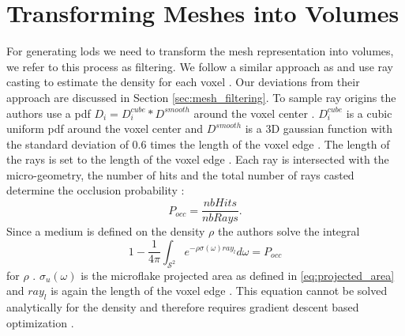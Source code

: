 \section{Transforming Meshes into Volumes}
\label{sec:transforming_meshes_into_volumes}
For generating \acp{lod} we need to transform the mesh representation into volumes, we refer to this process as filtering.
We follow a similar approach as \citeauthor{hybrid_mesh_volume_lods} and use ray casting to estimate the density for each voxel \cite{hybrid_mesh_volume_lods}.
Our deviations from their approach are discussed in Section \ref{sec:mesh_filtering}.
To sample ray origins the authors use a \ac{pdf} $D_i=D_i^{cube} \ast D^{smooth}$ around the voxel center \cite{hybrid_mesh_volume_lods}.
$D_i^{cube}$ is a cubic uniform \ac{pdf} around the voxel center and $D^{smooth}$ is a 3D gaussian function with the standard deviation of 0.6 times the length of the voxel edge \cite{hybrid_mesh_volume_lods}.
The length of the rays is set to the length of the voxel edge \cite{hybrid_mesh_volume_lods}.
Each ray is intersected with the micro-geometry, the number of hits and the total number of rays casted determine the occlusion probability \cite{hybrid_mesh_volume_lods}:
\begin{equation}
    P_{occ}=\frac{nbHits}{nbRays}.
\end{equation}
Since a medium is defined on the density $\rho$ the authors solve the integral
\begin{equation}
    1 - \frac{1}{4\pi}\int_{\mathcal{S}^2} e^{-\rho\sigma(\omega)ray_l} d\omega = P_{occ}
    \label{eq:loubet_filtering_equation}
\end{equation}
for $\rho$ \cite{hybrid_mesh_volume_lods}.
$\sigma_u(\omega)$ is the microflake projected area as defined in \ref{eq:projected_area} and $ray_l$ is again the length of the voxel edge \cite{hybrid_mesh_volume_lods}.
This equation cannot be solved analytically for the density and therefore requires gradient descent based optimization \cite{hybrid_mesh_volume_lods}.





